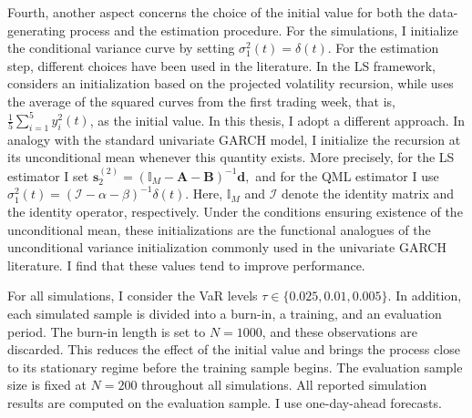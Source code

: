 \documentclass[12pt,a4paper]{article}
\theoremstyle{definition}
\begin{document}
Fourth, another aspect concerns the choice of the initial value for both the data-generating process and the estimation procedure. For the simulations, I initialize the conditional variance curve by setting $\sigma_1^2(t)=\delta(t)$. For the estimation step, different choices have been used in the literature. In the LS framework, \citet{Aue2017} considers an initialization based on the projected volatility recursion, while \citet{Cerovecki2019} uses the average of the squared curves from the first trading week, that is, $\frac{1}{5}\sum_{i=1}^5 y_i^2(t)$, as the initial value. In this thesis, I adopt a different approach. In analogy with the standard univariate GARCH model, I initialize the recursion at its unconditional mean whenever this quantity exists. More precisely, for the LS estimator I set
$\mathbf{s}_2^{(2)}=(\mathbb{I}_M-\mathbf{A}-\mathbf{B})^{-1}\mathbf{d},$ and for the QML estimator I use $\sigma_1^2(t)=(\mathcal{I}-\alpha-\beta)^{-1}\delta(t)$. Here, $\mathbb{I}_M$ and $\mathcal{I}$ denote the identity matrix and the identity operator, respectively. Under the conditions ensuring existence of the unconditional mean, these initializations are the functional analogues of the unconditional variance initialization commonly used in the univariate GARCH literature. I find that these values tend to improve performance.

For all simulations, I consider the VaR levels $\tau \in \{0.025, 0.01, 0.005\}$. In addition, each simulated sample is divided into a burn-in, a training, and an evaluation period. The burn-in length is set to $N=1000$, and these observations are discarded. This reduces the effect of the initial value and brings the process close to its stationary regime before the training sample begins. The evaluation sample size is fixed at $N=200$ throughout all simulations. All reported simulation results are computed on the evaluation sample. I use one-day-ahead forecasts.
\end{document}
